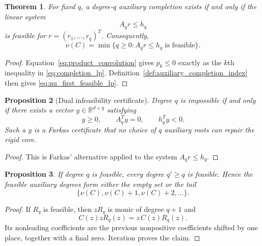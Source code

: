 \documentclass[11pt]{amsart}
\numberwithin{equation}{section}
\theoremstyle{plain}
\newtheorem{theorem}{Theorem}[section]
\newtheorem{proposition}[theorem]{Proposition}
\theoremstyle{definition}
\theoremstyle{remark}
\begin{document}
\begin{theorem}
\label{thm:completion_lp}
For fixed $q$, a degree-$q$ auxiliary completion exists if and only if the linear system
\begin{equation}
\boxed{
A_q r\leq h_q
}
\label{eq:completion_lp}
\end{equation}
is feasible for $r=(r_1,\ldots,r_q)^T$.  Consequently,
\begin{equation}
\boxed{
\nu(C)=\min\{q\geq0:A_qr\leq h_q\text{ is feasible}\}.
}
\label{eq:nu_first_feasible_lp}
\end{equation}
\end{theorem}

\begin{proof}
Equation~\eqref{eq:product_convolution} gives $p_k\leq0$ exactly as the $k$th inequality in \eqref{eq:completion_lp}.  Definition~\ref{def:auxiliary_completion_index} then gives \eqref{eq:nu_first_feasible_lp}.
\end{proof}

\begin{proposition}[Dual infeasibility certificate]
\label{prop:farkas_completion_certificate}
Degree $q$ is impossible if and only if there exists a vector $y\in\mathbb R^{d+q}$ satisfying
\begin{equation}
\boxed{
y\geq0,
\qquad
A_q^Ty=0,
\qquad
h_q^Ty<0.
}
\label{eq:farkas_completion_certificate}
\end{equation}
Such a $y$ is a Farkas certificate that no choice of $q$ auxiliary roots can repair the rigid core.
\end{proposition}

\begin{proof}
This is Farkas' alternative applied to the system $A_qr\leq h_q$.
\end{proof}

\begin{proposition}
\label{prop:completion_upward_closed}
If degree $q$ is feasible, every degree $q'\geq q$ is feasible.  Hence the feasible auxiliary degrees form either the empty set or the tail
\begin{equation}
\{\nu(C),\nu(C)+1,\nu(C)+2,\ldots\}.
\label{eq:completion_tail}
\end{equation}
\end{proposition}

\begin{proof}
If $R_q$ is feasible, then $zR_q$ is monic of degree $q+1$ and
\[
C(z)zR_q(z)=z\,C(z)R_q(z).
\]
Its nonleading coefficients are the previous nonpositive coefficients shifted by one place, together with a final zero.  Iteration proves the claim.
\end{proof}
\end{document}
